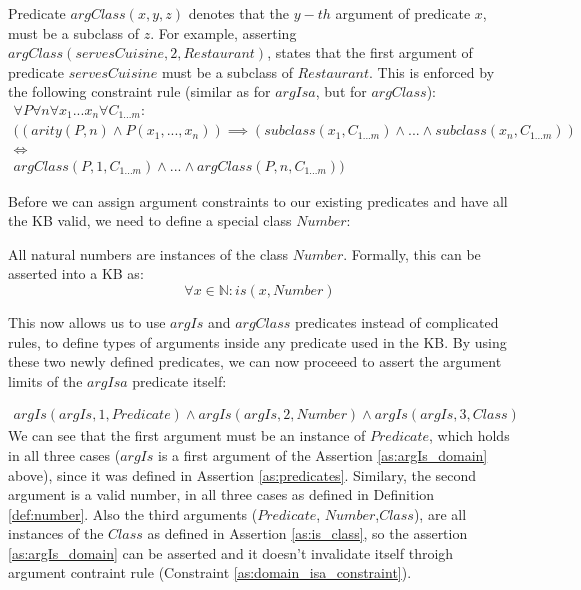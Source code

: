 \begin{definition}\label{def:pred_argClass}
Predicate $argClass(x,y,z)$ denotes that the $y-th$ argument of predicate $x$, 
must be a subclass of $z$. For example, asserting 
\\$argClass(servesCuisine, 2, Restaurant)$, states that the first argument of 
predicate $servesCuisine$ must be a subclass of $Restaurant$.
This is enforced by the following constraint rule (similar as for $argIsa$, but
for $argClass$):
\begin{equation}\label{as:domain_class_constraint}
\begin{gathered}
  \forall P \forall n \forall x_1...x_n \forall C_{1...m}: \\
  ((arity(P,n) \land P(x_1,...,x_n)) \implies (subclass(x_1,C_{1...m}) \land ... \land subclass(x_n,C_{1...m})) \\ 
  \iff \\
  argClass(P,1,C_{1...m}) \land ... \land argClass(P,n,C_{1...m}))
\end{gathered}
\end{equation}
\end{definition}

Before we can assign argument constraints to our existing predicates and have
all the KB valid, we need to define a special class $Number$:

\begin{definition}\label{def:number}
All natural numbers are instances of the class $Number$. Formally, this can be
asserted into a KB as:
\begin{equation}\label{as:numbers}
	\forall x \in \mathbb{N}:is(x,Number)
\end{equation}
\end{definition}

This now allows us to use $argIs$ and $argClass$ predicates instead of 
complicated rules, to define types of arguments inside any predicate used in the
KB. By using these two newly defined predicates, we can now proceeed to assert 
the argument limits of the $argIsa$ predicate itself: 

\begin{equation}\label{as:argIs_domain}
\begin{gathered}
argIs(argIs,1,Predicate) \land argIs(argIs,2,Number) \land argIs(argIs,3,Class) 
\end{gathered}
\end{equation}
We can see that the first argument must be an instance of $Predicate$, which 
holds in all three cases ($argIs$ is a first argument of the Assertion 
\ref{as:argIs_domain} above), since it was defined in Assertion 
\ref{as:predicates}. Similary, the second argument is a valid number, in all 
three cases as defined in Definition \ref{def:number}. Also the third arguments
($Predicate$, $Number$,$Class$), are all instances of the $Class$ as defined in
Assertion \ref{as:is_class}, so the assertion \ref{as:argIs_domain} can be asserted
and it doesn't invalidate itself throigh argument contraint rule (Constraint 
\ref{as:domain_isa_constraint}).

